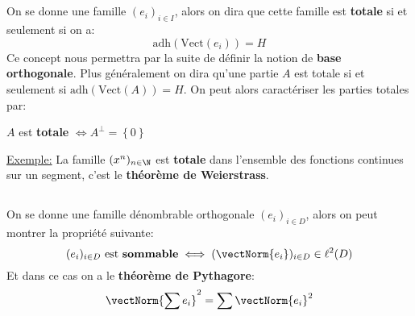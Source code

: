 \subsection*{}
On se donne une famille \( (e_i)_{i \in I} \), alors on dira que cette famille est \textbf{totale} si et seulement si on a:
\[ 
   \text{adh}\left(\text{Vect}(e_i)\right) = H  
\]
Ce concept nous permettra par la suite de définir la notion de \textbf{base orthogonale}. Plus généralement on dira qu'une partie \( A \) est totale si et seulement si \( \text{adh}\left(\text{Vect}(A)\right) = H \). On peut alors caractériser les parties totales par:
\begin{center}
   \( A \) est \textbf{totale} \( \iff A^\perp = \left\{ 0 \right\} \)
\end{center}
\uline{Exemple:} La famille \( (x^n)_{n \in \N} \) est \textbf{totale} dans l'ensemble des fonctions continues sur un segment, c'est le \textbf{théorème de Weierstrass}.

\subsection*{}
On se donne une famille dénombrable orthogonale \( (e_i)_{i \in D} \), alors on peut montrer la propriété suivante:
\[ 
   (e_i)_{i \in D} \text{ est \textbf{sommable}} \iff (\vectNorm{e_i})_{i \in D} \in \ell^2(D)
\]
Et dans ce cas on a le \textbf{théorème de Pythagore}:
\[ 
   \vectNorm{ \sum e_i }^2 = \sum \vectNorm{e_i}^2
\]
